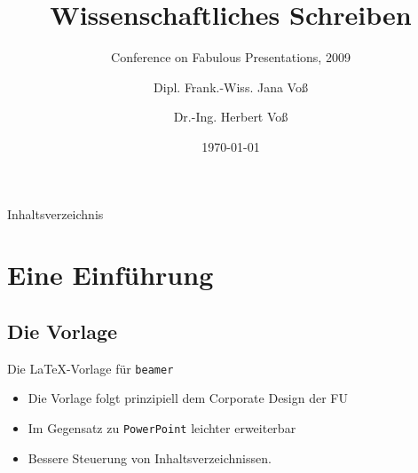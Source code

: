 \documentclass[t,smaller,compress]{FUbeamer}
\begin{document}
\title{Wissenschaftliches Schreiben}
\subtitle{Conference on Fabulous Presentations, 2009}
\author{Dipl. Frank.-Wiss. Jana Voß \and Dr.-Ing. Herbert Voß}
\date{\today}
\maketitle

\begin{frame}{Inhaltsverzeichnis}
\tableofcontents
\end{frame}

\section{Eine Einführung}
\subsection{Die Vorlage}
\begin{frame}{Die \LaTeX-Vorlage für \texttt{beamer}}
\begin{itemize}[<+-| alert@+>]
\item Die Vorlage folgt prinzipiell dem Corporate Design der FU
\item Im Gegensatz zu \texttt{PowerPoint} leichter erweiterbar
\item Bessere Steuerung von Inhaltsverzeichnissen.
\end{itemize}
\end{frame}
\end{document}
